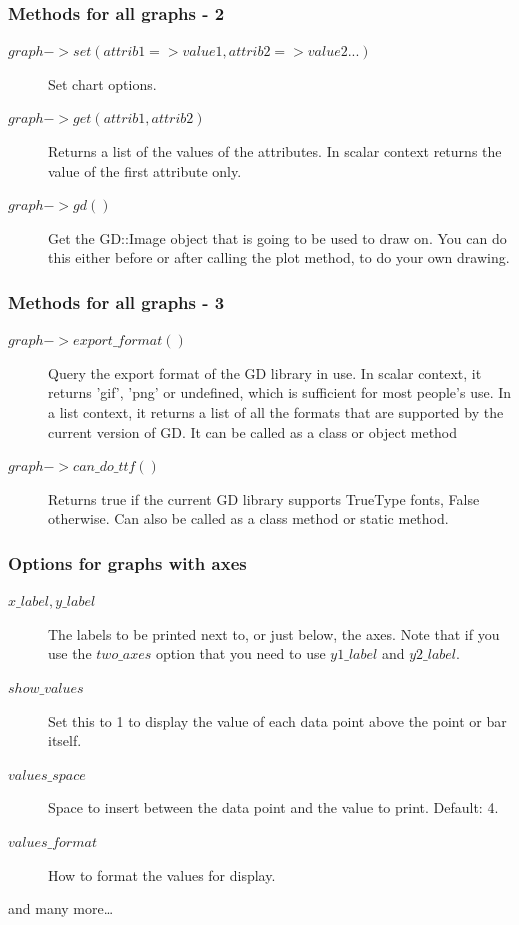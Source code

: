 \documentclass{beamer}
\begin{document}
\begin{frame} \frametitle{Methods for all graphs - 2}
\begin{description}
\item[$graph->set(attrib1 => value1, attrib2 => value2 ...)$] Set chart options.
\item[$graph->get(attrib1, attrib2)$] Returns a list of the values of the attributes. In scalar context returns the value of the first attribute only.
\item[$graph->gd()$] Get the GD::Image object that is going to be used to draw on. You can do this either before or after calling the plot method, to do your own drawing.
\end{description}
\end{frame}

\begin{frame} \frametitle{Methods for all graphs - 3}
\begin{description}
\item[$graph->export\_format()$] Query the export format of the GD library in use. In scalar context, it returns 'gif', 'png' or undefined, which is sufficient for most people's use. In a list context, it returns a list of all the formats that are supported by the current version of GD. It can be called as a class or object method
\item[$graph->can\_do\_ttf()$]Returns true if the current GD library supports TrueType fonts, False otherwise. Can also be called as a class method or static method.
\end{description}
\end{frame}

\begin{frame} \frametitle{Options for graphs with axes}
\begin{description}
\item[$x\_label, y\_label$] The labels to be printed next to, or just below, the axes. Note that if you use the $two\_axes$ option that you need to use $y1\_label$ and $y2\_label$.
\item[$show\_values$] Set this to 1 to display the value of each data point above the point or bar itself.
\item[$values\_space$] Space to insert between the data point and the value to print. Default: 4.
\item[$values\_format$] How to format the values for display.
\end{description}
and many more\ldots
\end{frame}
\end{document}
